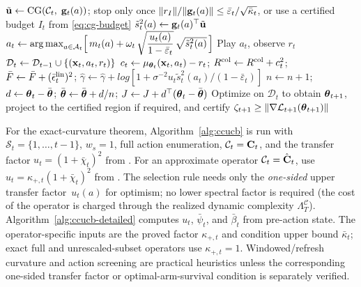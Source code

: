 \documentclass[twoside]{article}
\newcommand{\Calg}{\mathcal{C}}                 %
\newcommand{\Lamalg}{\Lambda^{\Calg}}           %
\begin{document}
\begin{algorithm}[H]
\begin{algorithmic}[1]
    \ELSE
      \STATE $\tilde\bu \gets \mathrm{CG}(\Calg_t,\;\bg_t(a))$; stop only once
           $\|r_I\|/\|\mathbf{g}_t(a)\| \le \bar\varepsilon_t/\sqrt{\bar\kappa_t}$,
           or use a certified budget $I_t$ from \eqref{eq:cg-budget}
        \hfill{} \label{line:cg-detailed}
      \STATE $\tilde{s}_t^2(a) \gets \mathbf{g}_t(a)^\top \tilde{\mathbf{u}}$
        \hfill{}
    \ENDIF
  \ENDFOR
  \STATE $a_t \gets \operatorname*{arg\,max}_{a\in\mathcal{A}_t}\Bigl[\,m_t(a)
    + \omega_t\,\sqrt{\dfrac{u_t(a)}{1-\bar\varepsilon_t}}\,
      \sqrt{\tilde{s}_t^2(a)}\,\Bigr]$
      \hfill{} \label{line:ucb-detailed}
  \STATE Play $a_t$, observe $r_t$
  \STATE $\mathcal{D}_t \gets \mathcal{D}_{t-1} \cup \{(\mathbf{x}_t, a_t, r_t)\}$
  \STATE $c_t\gets\mu_{\boldsymbol{\theta}_t}(\mathbf{x}_t,a_t)-r_t$;
         $R^{\rm col}\gets R^{\rm col}+c_t^2$;
         $\bar F\gets\bar F+(\bar\epsilon_t^{\rm lin})^2$;
         $\hat\gamma\gets\hat\gamma+log[1+\sigma^{-2}
         u_t\tilde s_t^2(a_t)/(1-\bar\varepsilon_t)]$
  \STATE $n\gets n+1$; $d\gets\boldsymbol{\theta}_t-\bar{\boldsymbol{\theta}}$;
         $\bar{\boldsymbol{\theta}}\gets\bar{\boldsymbol{\theta}}+d/n$;
         $J\gets J+d^\top(\boldsymbol{\theta}_t-\bar{\boldsymbol{\theta}})$
         \hfill{}
  \STATE Optimize on $\mathcal D_t$ to obtain $\boldsymbol{\theta}_{t+1}$, project to the
         certified region if required, and certify
         $\zeta_{t+1}\ge\|\nabla\mathcal{L}_{t+1}(\boldsymbol{\theta}_{t+1})\|$
\ENDFOR
\end{algorithmic}
\end{algorithm}

For the exact-curvature theorem, Algorithm~\ref{alg:ccucb} is run with
$\mathcal{S}_t=\{1,\ldots,t{-}1\}$, $w_s=1$, full action enumeration,
$\Calg_t=\bC_t$, and the transfer factor $u_t=(1+\bar\chi_t)^2$ from
.  For an approximate operator $\Calg_t=\hat\bC_t$, use
$u_t=\kappa_{+,t}(1+\bar\chi_t)^2$ from .
The selection rule needs only the \emph{one-sided} upper transfer
factor~$u_t(a)$ for optimism; no lower spectral factor is required (the cost
of the operator is charged through the realized dynamic complexity
$\Lamalg_T$).  Algorithm~\ref{alg:ccucb-detailed} computes $u_t$,
$\bar\psi_t$, and $\bar\beta_t$ from pre-action state.  The
operator-specific inputs are the proved factor $\kappa_{+,t}$ and condition
upper bound $\bar\kappa_t$; exact full and unrescaled-subset operators use
$\kappa_{+,t}=1$.
Windowed/refresh curvature and action screening are practical heuristics
unless the corresponding one-sided transfer factor or optimal-arm-survival
condition is separately verified.
\end{document}
